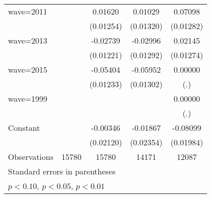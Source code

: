 {\begin{longtable}{l*{4}{c}}
\addlinespace
wave=2011           &                     &     0.01620         &     0.01029         &     0.07098\sym{***}\\
                    &                     &   (0.01254)         &   (0.01320)         &   (0.01282)         \\
\addlinespace
wave=2013           &                     &    -0.02739\sym{**} &    -0.02996\sym{**} &     0.02145\sym{*}  \\
                    &                     &   (0.01221)         &   (0.01292)         &   (0.01274)         \\
\addlinespace
wave=2015           &                     &    -0.05404\sym{***}&    -0.05952\sym{***}&     0.00000         \\
                    &                     &   (0.01233)         &   (0.01302)         &         (.)         \\
\addlinespace
wave=1999           &                     &                     &                     &     0.00000         \\
                    &                     &                     &                     &         (.)         \\
\addlinespace
Constant            &                     &    -0.00346         &    -0.01867         &    -0.08099\sym{***}\\
                    &                     &   (0.02120)         &   (0.02354)         &   (0.01984)         \\
\midrule
Observations        &       15780         &       15780         &       14171         &       12087         \\
\bottomrule
\multicolumn{5}{l}{\footnotesize Standard errors in parentheses}\\
\multicolumn{5}{l}{\footnotesize \sym{*} \(p<0.10\), \sym{**} \(p<0.05\), \sym{***} \(p<0.01\)}\\
\end{longtable}
}
